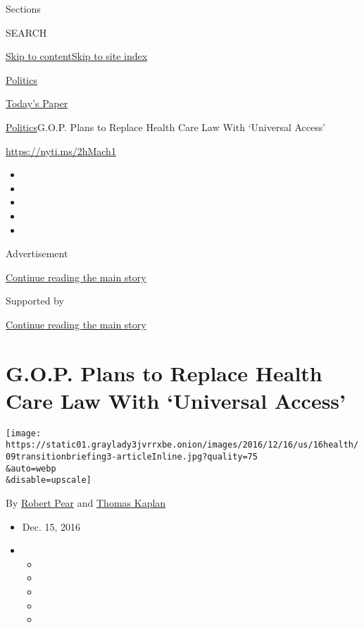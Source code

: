 Sections

SEARCH

\protect\hyperlink{site-content}{Skip to
content}\protect\hyperlink{site-index}{Skip to site index}

\href{https://www.nytimes3xbfgragh.onion/section/politics}{Politics}

\href{https://myaccount.nytimes3xbfgragh.onion/auth/login?response_type=cookie\&client_id=vi}{}

\href{https://www.nytimes3xbfgragh.onion/section/todayspaper}{Today's
Paper}

\href{/section/politics}{Politics}\textbar{}G.O.P. Plans to Replace
Health Care Law With `Universal Access'

\url{https://nyti.ms/2hMach1}

\begin{itemize}
\item
\item
\item
\item
\item
\end{itemize}

Advertisement

\protect\hyperlink{after-top}{Continue reading the main story}

Supported by

\protect\hyperlink{after-sponsor}{Continue reading the main story}

\hypertarget{gop-plans-to-replace-health-care-law-with-universal-access}{%
\section{G.O.P. Plans to Replace Health Care Law With `Universal
Access'}\label{gop-plans-to-replace-health-care-law-with-universal-access}}

\texttt{[image: https://static01.graylady3jvrrxbe.onion/images/2016/12/16/us/16health/09transitionbriefing3-articleInline.jpg?quality=75\\\&auto=webp\\\&disable=upscale]}

By \href{https://www.nytimes3xbfgragh.onion/by/robert-pear}{Robert Pear}
and \href{http://www.nytimes3xbfgragh.onion/by/thomas-kaplan}{Thomas
Kaplan}

\begin{itemize}
\item
  Dec. 15, 2016
\item
  \begin{itemize}
  \item
  \item
  \item
  \item
  \item
  \end{itemize}
\end{itemize}

